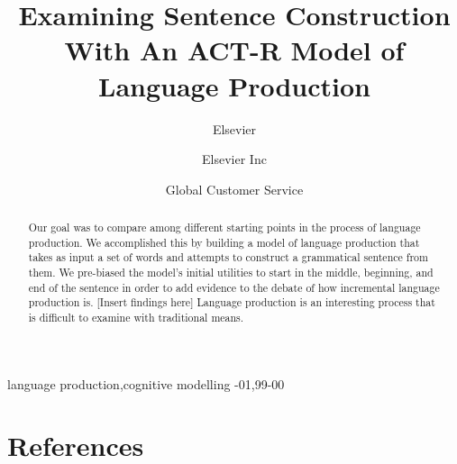 \documentclass[review]{elsarticle}
\begin{document}
\begin{frontmatter}

\title{Examining Sentence Construction With An ACT-R Model of Language Production}

\author{Elsevier}
\address{Radarweg 29, Amsterdam}

\author[mymainaddress,mysecondaryaddress]{Elsevier Inc}

\author[mysecondaryaddress]{Global Customer Service}

\address[mymainaddress]{1600 John F Kennedy Boulevard, Philadelphia}
\address[mysecondaryaddress]{360 Park Avenue South, New York}

\begin{abstract}
Our goal was to compare among different starting points in the process of language production. We accomplished this by building a model of language production that takes as input a set of words and attempts to construct a grammatical sentence from them. We pre-biased the model's initial utilities to start in the middle, beginning, and end of the sentence in order to add evidence to the debate of how incremental language production is. [Insert findings here]  Language production is an interesting process that is difficult to examine with traditional means. 
\end{abstract}

\begin{keyword}
language production\sep cognitive modelling
-01\sep  99-00
\end{keyword}

\end{frontmatter}

\linenumbers





%
%
%
%




%
%
%
%

\section*{References}

\end{document}
